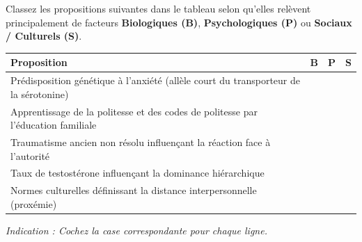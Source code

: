 \documentclass[11pt]{article}
\begin{document}
\begin{exercice}
Classez les propositions suivantes dans le tableau selon qu'elles relèvent principalement de facteurs \textbf{Biologiques (B)}, \textbf{Psychologiques (P)} ou \textbf{Sociaux / Culturels (S)}.
\begin{center}
\begin{tabularx}{\linewidth}{|l|>{\centering\arraybackslash}X|>{\centering\arraybackslash}X|>{\centering\arraybackslash}X|}
\hline
\textbf{Proposition} & \textbf{B} & \textbf{P} & \textbf{S} \\
\hline
Prédisposition génétique à l'anxiété (allèle court du transporteur de la sérotonine) & & & \\
\hline
Apprentissage de la politesse et des codes de politesse par l'éducation familiale & & & \\
\hline
Traumatisme ancien non résolu influençant la réaction face à l'autorité & & & \\
\hline
Taux de testostérone influençant la dominance hiérarchique & & & \\
\hline
Normes culturelles définissant la distance interpersonnelle (proxémie) & & & \\
\hline
\end{tabularx}
\end{center}
\textit{Indication : Cochez la case correspondante pour chaque ligne.}
\end{exercice}
\end{document}
